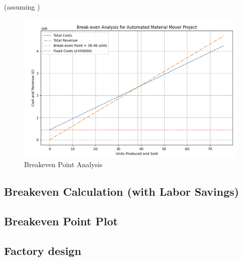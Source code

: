 \documentclass[12pt]{article}
\begin{document}
 (assuming )


 \begin{figure}[h!]
    \centering
    \includegraphics[width=1\textwidth]{breakeven.png}  %
    \caption{Breakeven Point Analysis}
    \label{fig:breakeven}
\end{figure} 

 

\subsection*{Breakeven Calculation (with Labor Savings)}

 

 
 

 
 

\subsection*{Breakeven Point Plot}

  


\subsection{Factory design}
\end{document}

